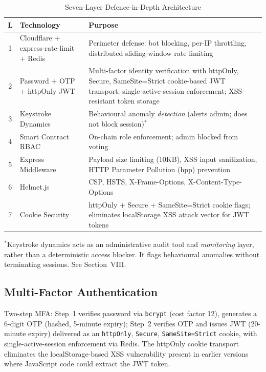 \documentclass[conference]{IEEEtran}
\begin{document}
\begin{table}[htbp]
\centering
\caption{Seven-Layer Defence-in-Depth Architecture}
\label{tab:security}
\renewcommand{\arraystretch}{1.15}
\scriptsize
\begin{tabular}{|c|p{2.2cm}|p{4.3cm}|}
\hline
\textbf{L} & \textbf{Technology} & \textbf{Purpose} \\
\hline
1 & Cloudflare + express-rate-limit + Redis & Perimeter defense: bot blocking, per-IP throttling, distributed sliding-window rate limiting \\
\hline
2 & Password + OTP + httpOnly JWT & Multi-factor identity verification with httpOnly, Secure, SameSite=Strict cookie-based JWT transport; single-active-session enforcement; XSS-resistant token storage \\
\hline
3 & Keystroke Dynamics & Behavioural anomaly \emph{detection} (alerts admin; does not block session)$^*$ \\
\hline
4 & Smart Contract RBAC & On-chain role enforcement; admin blocked from voting \\
\hline
5 & Express Middleware & Payload size limiting (10KB), XSS input sanitization, HTTP Parameter Pollution (hpp) prevention \\
\hline
6 & Helmet.js & CSP, HSTS, X-Frame-Options, X-Content-Type-Options \\
\hline
7 & Cookie Security & httpOnly + Secure + SameSite=Strict cookie flags; eliminates localStorage XSS attack vector for JWT tokens \\
\hline
\end{tabular}

\vspace{2pt}
\scriptsize{$^*$Keystroke dynamics acts as an administrative audit tool and \emph{monitoring} layer, rather than a deterministic access blocker. It flags behavioural anomalies without terminating sessions. See Section~VIII.}
\end{table}

\subsection{Multi-Factor Authentication}
Two-step MFA: Step~1 verifies password via \texttt{bcrypt} (cost factor 12), generates a 6-digit OTP (hashed, 5-minute expiry); Step~2 verifies OTP and issues JWT (20-minute expiry) delivered as an \texttt{httpOnly}, \texttt{Secure}, \texttt{SameSite=Strict} cookie, with single-active-session enforcement via Redis. The httpOnly cookie transport eliminates the localStorage-based XSS vulnerability present in earlier versions where JavaScript code could extract the JWT token.
\end{document}
